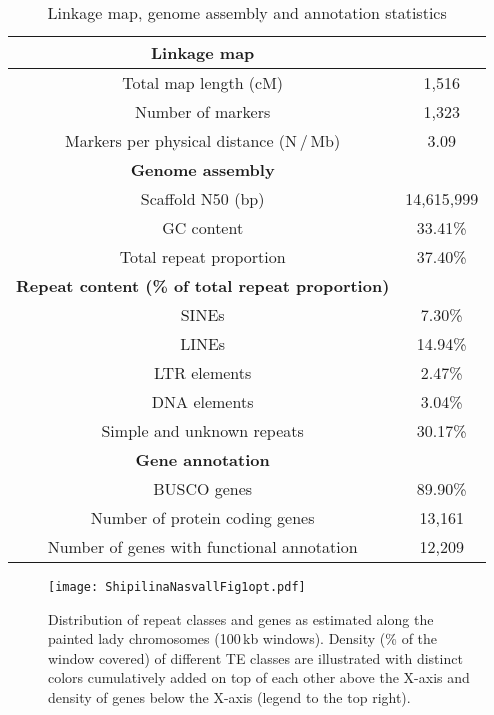 \documentclass[twocolumn]{bmcart}%
\begin{document}
\begin{table}[h!]
\caption{Linkage map, genome assembly and annotation statistics}
\label{tab:1} %
  \begin{tabular}{cc}
    \hline
    \textbf{Linkage map}
     &    \\ \hline
    Total map length (cM) & 1,516 \\
    Number of markers & 1,323 \\
    Markers per physical distance (N\,/\,Mb) & 3.09  \\ \hline
      \textbf{Genome assembly}
     &    \\ \hline
   Scaffold N50 (bp) & 14,615,999 \\
   GC content & 33.41\% \\
   Total repeat proportion & 37.40\%  \\ \hline
         \textbf{Repeat content (\% of total repeat proportion)}
     &    \\ \hline
   SINEs & 7.30\% \\
   LINEs & 14.94\% \\
   LTR elements & 2.47\%  \\ 
   DNA elements & 3.04\% \\
   Simple and unknown repeats & 30.17\% \\ \hline
 \textbf{Gene annotation}  &    \\ \hline  
   BUSCO genes & 89.90\% \\
Number of protein coding genes & 13,161 \\
Number of genes with functional annotation & 12,209 \\ \hline
  \end{tabular}
\end{table}

\begin{figure*}[p]
  \caption{Distribution of repeat classes and genes as estimated along the painted lady chromosomes (100\,kb windows). Density (\% of the window covered) of different TE classes are illustrated with distinct colors cumulatively added on top of each other above the X-axis and density of genes below the X-axis (legend to the top right).}
  \label{fig:1} %
  \texttt{[image: ShipilinaNasvallFig1opt.pdf]}
\end{figure*}
\end{document}
